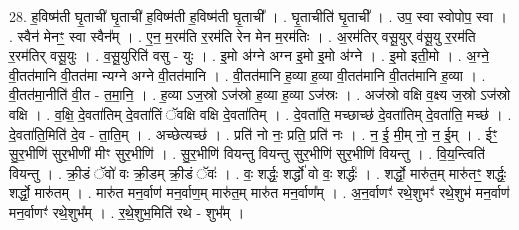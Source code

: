 \documentclass[17pt]{extarticle}
\begin{document}
28. ह॒विष्म॑ती घृ॒ताची॑ घृ॒ताची॑ ह॒विष्म॑ती ह॒विष्म॑ती घृ॒ताची᳚ । . घृ॒ताचीति॑ घृ॒ताची᳚ । . उप॒ स्वा स्वोपोप॒ स्वा । . स्वैन॑ मेनꣳ॒॒ स्वा स्वैन᳚म् । . ए॒न॒ म॒रम॑ति र॒रम॑ति रेन मेन म॒रम॑तिः । . अ॒रम॑तिर् वसू॒युर् व॑सू॒यु र॒रम॑ति र॒रम॑तिर् वसू॒युः । . व॒सू॒युरिति॑ वसु - युः । . इ॒मो अ॑ग्ने अग्न इ॒मो इ॒मो अ॑ग्ने । . इ॒मो इती॒मो । . अ॒ग्ने॒ वी॒तत॑मानि वी॒तत॑मा न्यग्ने अग्ने वी॒तत॑मानि । . वी॒तत॑मानि ह॒व्या ह॒व्या वी॒तत॑मानि वी॒तत॑मानि ह॒व्या । . वी॒तत॑मा॒नीति॑ वी॒त - त॒मा॒नि॒ । . ह॒व्या ऽज॒स्रो ऽज॑स्रो ह॒व्या ह॒व्या ऽज॑स्रः । . अज॑स्रो वक्षि व॒क्ष्य ज॒स्रो ऽज॑स्रो वक्षि । . व॒क्षि॒ दे॒वता॑तिम् दे॒वता॑तिं ॅवक्षि वक्षि दे॒वता॑तिम् । . दे॒वता॑ति॒ मच्छाच्छ॑ दे॒वता॑तिम् दे॒वता॑ति॒ मच्छ॑ । . दे॒वता॑ति॒मिति॑ दे॒व - ता॒ति॒म् । . अच्छेत्यच्छ॑ । . प्रति॑ नो नः॒ प्रति॒ प्रति॑ नः । . न॒ ई॒ मी॒म् नो॒ न॒ ई॒म् । . ईꣳ॒॒ सु॒र॒भीणि॑ सुर॒भीणी॑ मीꣳ सुर॒भीणि॑ । . सु॒र॒भीणि॑ वियन्तु वियन्तु सुर॒भीणि॑ सुर॒भीणि॑ वियन्तु । . वि॒य॒न्त्विति॑ वियन्तु । . क्री॒डं ॅवो॑ वः क्री॒डम् क्री॒डं ॅवः॑ । . वः॒ शर्द्धः॒ शर्द्धो॑ वो वः॒ शर्द्धः॑ । . शर्द्धो॒ मारु॑त॒म् मारु॑तꣳ॒॒ शर्द्धः॒ शर्द्धो॒ मारु॑तम् । . मारु॑त मन॒र्वाण॑ मन॒र्वाण॒म् मारु॑त॒म् मारु॑त मन॒र्वाण᳚म् । . अ॒न॒र्वाणꣳ॑ रथे॒शुभꣳ॑ रथे॒शुभ॑ मन॒र्वाण॑ मन॒र्वाणꣳ॑ रथे॒शुभ᳚म् । . र॒थे॒शुभ॒मिति॑ रथे - शुभ᳚म् । \newline
\end{document}

